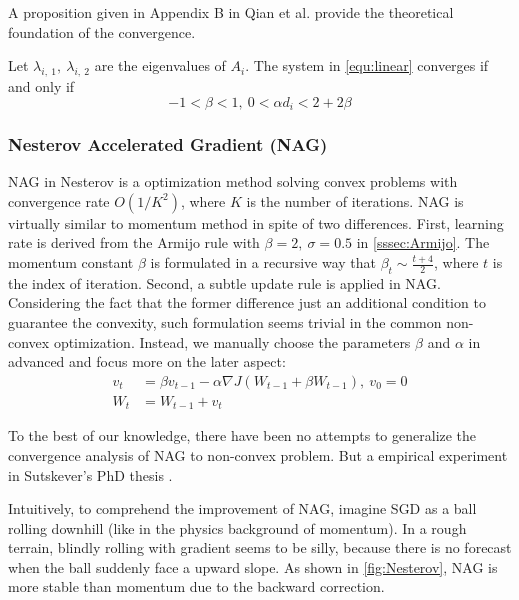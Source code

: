 A proposition given in Appendix B in Qian et al. 
\parencite{qian1999momentum} provide the theoretical
foundation of the convergence.
\begin{pro}
    Let $ \lambda_{i,\ 1},\ \lambda_{i,\ 2} $ are the 
    eigenvalues of $ A_i $. The system in \autoref{equ:linear}
    converges if and only if 
    \begin{equation}
        -1 < \beta < 1,\ 0 < \alpha d_i < 2+2\beta 
    \end{equation}
\end{pro}

\subsubsection{Nesterov Accelerated Gradient (NAG)}
\label{sssec:NAG}
NAG in Nesterov \parencite{nesterov1983method}
is a optimization method solving convex problems with 
convergence rate $ O(1/K^2) $, where $ K $ is the number of iterations.
NAG is virtually similar to momentum method in spite of two differences.
First, learning rate is derived from the Armijo rule with $ \beta = 2,\ 
\sigma = 0.5 $ in \autoref{sssec:Armijo}. The momentum constant $ \beta $
is formulated in a recursive way that $ \beta_t \sim \frac{t+4}{2} $, where 
$ t $ is the index of iteration. Second, a subtle update rule is applied 
in NAG. Considering the fact that the former difference just an additional
condition to guarantee the convexity, such formulation seems trivial in 
the common non-convex optimization. Instead, we manually choose the parameters
$ \beta $ and $ \alpha $ in advanced and focus more on the later aspect:
\begin{equation}
    \begin{split}
        v_t & = \beta v_{t-1} - \alpha\nabla J(W_{t-1} + \beta W_{t-1}),\ v_0 = 0 \\
        W_t & = W_{t-1} +  v_t
    \end{split}
\end{equation}
\par To the best of our knowledge, there have been no attempts to generalize the 
convergence analysis of NAG to non-convex problem. But a empirical experiment
in Sutskever's PhD thesis \parencite{sutskever2013training}. 
\par Intuitively, to comprehend the improvement of NAG, imagine SGD as a ball
rolling downhill (like in the physics background of momentum). In a rough terrain,
blindly rolling with gradient seems to be silly, because there is no forecast 
when the ball suddenly face a upward slope. As shown in \autoref{fig:Nesterov}, 
NAG is more stable than momentum due to the backward correction.

